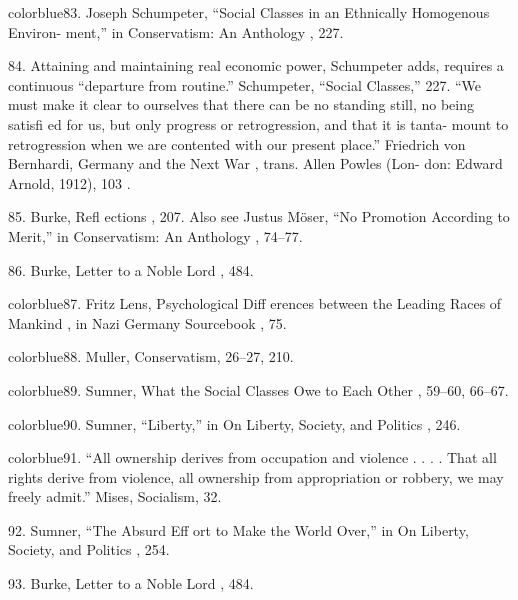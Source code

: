 	{color{blue}83}. Joseph Schumpeter, “Social Classes in an Ethnically Homogenous Environ- ment,” in Conservatism: An Anthology , 227.


	{\color{blue}84}. Attaining and maintaining real economic power, Schumpeter adds, requires a continuous “departure from routine.” Schumpeter, “Social Classes,” 227. “We must make it clear to ourselves that there can be no standing still, no being satisfi ed for us, but only progress or retrogression, and that it is tanta- mount to retrogression when we are contented with our present place.” Friedrich von Bernhardi, Germany and the Next War , trans. Allen Powles (Lon- don: Edward Arnold, 1912), 103 .


	{\color{blue}85}. Burke, Refl ections , 207. Also see Justus Möser, “No Promotion According to Merit,” in Conservatism: An Anthology , 74–77.


	{\color{blue}86}. Burke, Letter to a Noble Lord , 484.


	{color{blue}87}. Fritz Lens, Psychological Diff erences between the Leading Races of Mankind , in Nazi Germany Sourcebook , 75.


	{color{blue}88}. Muller, Conservatism, 26–27, 210.


	{color{blue}89}. Sumner, What the Social Classes Owe to Each Other , 59–60, 66–67.


	{color{blue}90}. Sumner, “Liberty,” in On Liberty, Society, and Politics , 246.


	{color{blue}91}. “All ownership derives from occupation and violence . . . . That all rights derive from violence, all ownership from appropriation or robbery, we may freely admit.” Mises, Socialism, 32.


	{\color{blue}92}. Sumner, “The Absurd Eff ort to Make the World Over,” in On Liberty, Society, and Politics , 254.


	{\color{blue}93}. Burke, Letter to a Noble Lord , 484.


